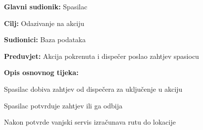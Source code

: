 					\noindent {}
					\begin{packed_item}
	
						\item \textbf{Glavni sudionik: }\text Spasilac
						\item  \textbf{Cilj:} \text Odazivanje na akciju
						\item  \textbf{Sudionici:} \text Baza podataka
						\item  \textbf{Preduvjet:} \text Akcija pokrenuta i dispečer poslao zahtjev spasiocu
						\item  \textbf{Opis osnovnog tijeka:}
						
						\item[] \begin{packed_enum}
	
							\item \text Spasilac dobiva zahtjev od dispečera za uključenje u akciju
							\item \text Spasilac potvrduje zahtjev ili ga odbija
							\item \text Nakon potvrde vanjski servis izračunava rutu do lokacije
						\end{packed_enum}
						
					\end{packed_item}
				
